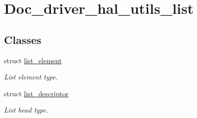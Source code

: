 \hypertarget{group__doc__driver__hal__utils__list}{}\section{Doc\+\_\+driver\+\_\+hal\+\_\+utils\+\_\+list}
\label{group__doc__driver__hal__utils__list}
\subsection*{Classes}
\begin{DoxyCompactItemize}
\item 
struct \hyperlink{structlist__element}{list\+\_\+element}
\begin{DoxyCompactList}\small\item\em List element type. \end{DoxyCompactList}\item 
struct \hyperlink{structlist__descriptor}{list\+\_\+descriptor}
\begin{DoxyCompactList}\small\item\em List head type. \end{DoxyCompactList}\end{DoxyCompactItemize}
